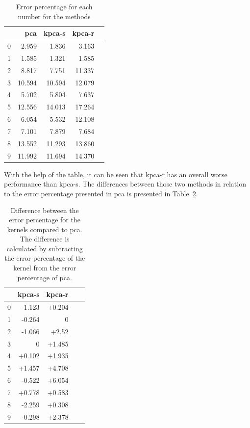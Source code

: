 \begin{table}[htb!]
    \centering
    \begin{tabular}{lrrrr}
        \toprule
          & pca    & kpca-s & kpca-r \\
        \midrule
        0 & 2.959  & 1.836  & 3.163  \\
        1 & 1.585  & 1.321  & 1.585  \\
        2 & 8.817  & 7.751  & 11.337 \\
        3 & 10.594 & 10.594 & 12.079 \\
        4 & 5.702  & 5.804  & 7.637  \\
        5 & 12.556 & 14.013 & 17.264 \\
        6 & 6.054  & 5.532  & 12.108 \\
        7 & 7.101  & 7.879  & 7.684  \\
        8 & 13.552 & 11.293 & 13.860 \\
        9 & 11.992 & 11.694 & 14.370 \\
        \bottomrule
    \end{tabular}
    \caption{Error percentage for each number for the methods}
    \label{tab:error-percentage-pca-kpca-s-kpca-r}
\end{table}


With the help of the table, it can be seen that \gls{kpca-r} has an overall worse performance than \gls{kpca-s}. The differences between those two methods in relation to the error percentage presented in \gls{pca} is presented in Table~\ref{tab:error-percentage-difference-pca-kpca-s-kpca-r}.

\begin{table}[htb!]
    \centering
    \begin{tabular}{lrrrr}
        \toprule
           & kpca-s & kpca-r    \\
        \midrule
        0  & -1.123  & +0.204   \\
        1  & -0.264  & 0        \\
        2  & -1.066  & +2.52    \\
        3  &  0      & +1.485   \\
        4  & +0.102  & +1.935   \\
        5  & +1.457  & +4.708   \\
        6  & -0.522  & +6.054   \\
        7  & +0.778  & +0.583   \\
        8  & -2.259  &  +0.308  \\
        9  & -0.298  & +2.378   \\
        \bottomrule
    \end{tabular}
    \caption{Difference between the error percentage for the kernels compared to pca. The difference is calculated by subtracting the error percentage of the kernel from the error percentage of pca.}
    \label{tab:error-percentage-difference-pca-kpca-s-kpca-r}
\end{table}

